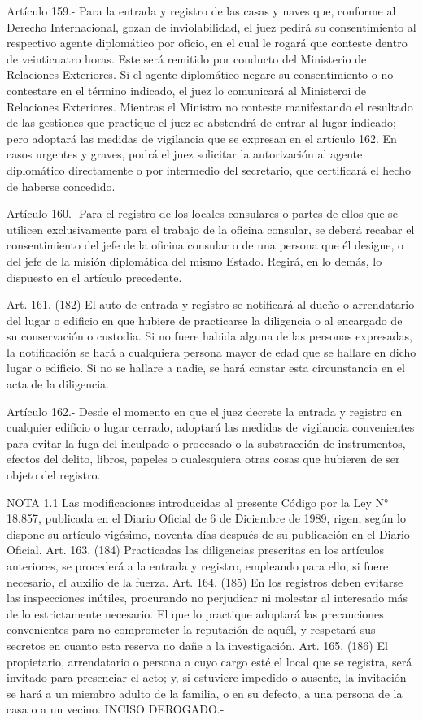     Artículo 159.- Para la entrada y registro de las casas y naves que, conforme al Derecho Internacional, gozan de inviolabilidad, el juez pedirá su consentimiento al respectivo agente diplomático por oficio, en el cual le rogará que conteste dentro de veinticuatro horas. Este será remitido por conducto del Ministerio de Relaciones Exteriores.
    Si el agente diplomático negare su consentimiento o no contestare en el término indicado, el juez lo comunicará al Ministeroi de Relaciones Exteriores. Mientras el Ministro no conteste manifestando el resultado de las gestiones que practique el juez se abstendrá de entrar al lugar indicado; pero adoptará las medidas de vigilancia que se expresan en el artículo 162.
    En casos urgentes y graves, podrá el juez solicitar la autorización al agente diplomático directamente o por intermedio del secretario, que certificará el hecho de haberse concedido.

    Artículo 160.- Para el registro de los locales consulares o partes de ellos que se utilicen exclusivamente para el trabajo de la oficina consular, se deberá recabar el consentimiento del jefe de la oficina consular o de una persona que él designe, o del jefe de la misión diplomática del mismo Estado.
    Regirá, en lo demás, lo dispuesto en el artículo precedente.

    Art. 161. (182) El auto de entrada y registro se notificará al dueño o arrendatario del lugar o edificio en que hubiere de practicarse la diligencia o al encargado de su conservación o custodia.
    Si no fuere habida alguna de las personas expresadas, la notificación se hará a cualquiera persona mayor de edad que se hallare en dicho lugar o edificio.
    Si no se hallare a nadie, se hará constar esta circunstancia en el acta de la diligencia.


    Artículo 162.- Desde el momento en que el juez decrete la entrada y registro en cualquier edificio o lugar cerrado, adoptará las medidas de vigilancia convenientes para evitar la fuga del inculpado o procesado o la substracción de instrumentos, efectos del delito, libros, papeles o cualesquiera otras cosas que hubieren de ser objeto del registro.


NOTA 1.1
    Las modificaciones introducidas al presente Código por la Ley N° 18.857, publicada en el Diario Oficial de 6 de Diciembre de 1989, rigen, según lo dispone su artículo vigésimo, noventa días después de su publicación en el Diario Oficial.
    Art. 163. (184) Practicadas las diligencias prescritas en los artículos anteriores, se procederá a la entrada y registro, empleando para ello, si fuere necesario, el auxilio de la fuerza.
    Art. 164. (185) En los registros deben evitarse las inspecciones inútiles, procurando no perjudicar ni molestar al interesado más de lo estrictamente necesario. El que lo practique adoptará las precauciones convenientes para no comprometer la reputación de aquél, y respetará sus secretos en cuanto esta reserva no dañe a la investigación.
    Art. 165. (186) El propietario, arrendatario o persona a cuyo cargo esté el local que se registra, será invitado para presenciar el acto; y, si estuviere impedido o ausente, la invitación se hará a un miembro adulto de la familia, o en su defecto, a una persona de la casa o a un vecino.
    INCISO DEROGADO.-

